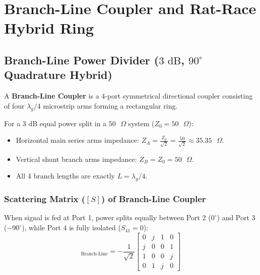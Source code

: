\documentclass[12pt,a4paper]{article}
\begin{document}
\section{Branch-Line Coupler and Rat-Race Hybrid Ring}

\subsection{Branch-Line Power Divider ($3\text{ dB}$, $90^\circ$ Quadrature Hybrid)}
A \textbf{Branch-Line Coupler} is a 4-port symmetrical directional coupler consisting of four $\lambda_g/4$ microstrip arms forming a rectangular ring.

\begin{tcolorbox}[masonbox, title={Branch-Line Coupler Design Parameters}]
  For a $3\text{ dB}$ equal power split in a $50\text{ }\Omega$ system ($Z_0 = 50\text{ }\Omega$):
  \begin{itemize}[leftmargin=*, noitemsep]
    \item Horizontal main series arms impedance: $Z_A = \frac{Z_0}{\sqrt{2}} = \frac{50}{\sqrt{2}} \approx 35.35\text{ }\Omega$.
    \item Vertical shunt branch arms impedance: $Z_B = Z_0 = 50\text{ }\Omega$.
    \item All 4 branch lengths are exactly $L = \lambda_g/4$.
  \end{itemize}
\end{tcolorbox}

\subsubsection{Scattering Matrix ($[S]$) of Branch-Line Coupler}
When signal is fed at Port 1, power splits equally between Port 2 ($0^\circ$) and Port 3 ($-90^\circ$), while Port 4 is fully isolated ($S_{41} = 0$):
\begin{equation}
  [S]_{\text{Branch-Line}} = -\frac{1}{\sqrt{2}} \begin{bmatrix} 0 & j & 1 & 0 \\ j & 0 & 0 & 1 \\ 1 & 0 & 0 & j \\ 0 & 1 & j & 0 \end{bmatrix}
\end{equation}
\end{document}
